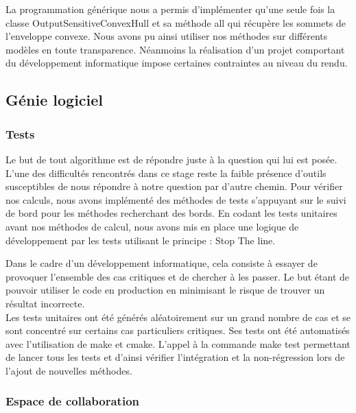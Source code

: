 La programmation générique nous a permis d'implémenter qu'une seule fois la classe OutputSensitiveConvexHull et sa méthode all qui récupère les sommets de l'enveloppe convexe. Nous avons pu ainsi utiliser nos méthodes sur différents modèles en toute transparence. Néanmoins la réalisation d'un projet comportant du développement informatique impose certaines contraintes au niveau du rendu. 

\subsection{Génie logiciel}

\subsubsection{Tests}

Le but de tout algorithme est de répondre juste à la question qui lui est posée. L'une des difficultés rencontrés dans ce stage reste la faible présence d'outils susceptibles de nous répondre à notre question par d'autre chemin. Pour vérifier nos calculs, nous avons implémenté des méthodes de tests s'appuyant sur le suivi de bord pour les méthodes recherchant des bords. En codant les tests unitaires avant nos méthodes de calcul, nous avons mis en place une logique de développement par les tests utilisant le principe : Stop The line. \cite{stoptheline}

Dans le cadre d'un développement informatique, cela consiste à essayer de provoquer l'ensemble des cas critiques et de chercher à les passer. Le but étant de pouvoir utiliser le code en production en minimisant le risque de trouver un résultat incorrecte.\\


Les tests unitaires ont été générés aléatoirement sur un grand nombre de cas et se sont concentré sur certains cas particuliers critiques. Ses tests ont été automatisés avec l'utilisation de make et cmake. L'appel à la commande make test permettant de lancer tous les tests et d'ainsi vérifier l'intégration et la non-régression lors de l'ajout de nouvelles méthodes. 


\subsubsection{Espace de collaboration}

